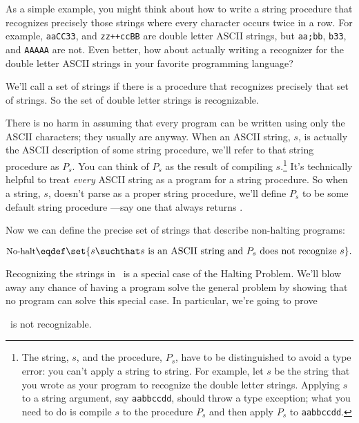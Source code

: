 As a simple example, you might think about how to write a string
procedure that recognizes precisely those  strings
where every character occurs twice in a row.  For example,
\texttt{aaCC33}, and \texttt{zz++ccBB} are double letter ASCII
strings, but \texttt{aa;bb}, \texttt{b33}, and \texttt{AAAAA} are not.
Even better, how about actually writing a recognizer for the double
letter ASCII strings in your favorite programming language?

We'll call a set of strings  if there is a
procedure that recognizes precisely that set of strings.  So the set
of double letter strings is recognizable.

There is no harm in assuming that every program can be written using
only the ASCII characters; they usually are anyway.  When an ASCII
string, $s$, is actually the ASCII description of some string
procedure, we'll refer to that string procedure as $P_s$.  You can
think of $P_s$ as the result of compiling $s$.\footnote{The string,
  $s$, and the procedure, $P_s$, have to be distinguished to avoid a
  type error: you can't apply a string to string.  For example, let
  $s$ be the string that you wrote as your program to recognize the
  double letter strings.  Applying $s$ to a string argument, say
  \texttt{aabbccdd}, should throw a type exception; what you need to
  do is compile $s$ to the procedure $P_s$ and then apply $P_s$ to
  \texttt{aabbccdd}.  \iffalse This should result in a returned value
  \True, since \texttt{aabbccdd} is a double letter string.\fi }
It's technically helpful to treat \emph{every} ASCII string as a
program for a string procedure.  So when a string, $s$, doesn't parse
as a proper string procedure, we'll define $P_s$ to be some default
string procedure ---say one that always returns \False.  \iffalse So
$s$ is an ill-formed string, $P_S$ will be a recognizer for the empty
set of strings.  \fi

Now we can define the precise set of strings that describe non-halting
programs:
\begin{definition}\label{nohalt_def}
\begin{equation}\label{nohalt_eqdef}
\nohalt \eqdef \set{s \suchthat s \text{ is an ASCII string and } P_s
  \text{ does not recognize } s}.
\end{equation}
\end{definition}
Recognizing the strings in \nohalt\ is a special case of the Halting
Problem.  We'll blow away any chance of having a program solve the
general problem by showing that no program can solve this special
case.  In particular, we're going to prove
\begin{theorem}\label{nohalt_thm}
\nohalt\ is not recognizable.
\end{theorem}

